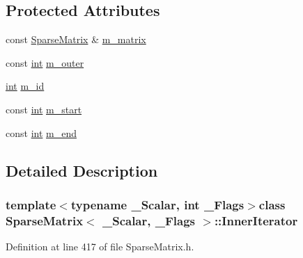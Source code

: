 \subsection*{Protected Attributes}
\begin{DoxyCompactItemize}
\item 
const \hyperlink{class_sparse_matrix}{Sparse\-Matrix} \& \hyperlink{class_sparse_matrix_1_1_inner_iterator_abdfdb78265864b419133fbb24a293c01}{m\-\_\-matrix}
\item 
const \hyperlink{ioapi_8h_a787fa3cf048117ba7123753c1e74fcd6}{int} \hyperlink{class_sparse_matrix_1_1_inner_iterator_aa6bee154b1f23cd7510a459c3bc33c9c}{m\-\_\-outer}
\item 
\hyperlink{ioapi_8h_a787fa3cf048117ba7123753c1e74fcd6}{int} \hyperlink{class_sparse_matrix_1_1_inner_iterator_a715fcceba7bd2cddd4a09572a81f6a3d}{m\-\_\-id}
\item 
const \hyperlink{ioapi_8h_a787fa3cf048117ba7123753c1e74fcd6}{int} \hyperlink{class_sparse_matrix_1_1_inner_iterator_ab921abc4c659845a3e19479047ab56c0}{m\-\_\-start}
\item 
const \hyperlink{ioapi_8h_a787fa3cf048117ba7123753c1e74fcd6}{int} \hyperlink{class_sparse_matrix_1_1_inner_iterator_a5ddf9c88f723aeaa34b3e376e05ff0e7}{m\-\_\-end}
\end{DoxyCompactItemize}


\subsection{Detailed Description}
\subsubsection*{template$<$typename \-\_\-\-Scalar, int \-\_\-\-Flags$>$class Sparse\-Matrix$<$ \-\_\-\-Scalar, \-\_\-\-Flags $>$\-::\-Inner\-Iterator}



Definition at line 417 of file Sparse\-Matrix.\-h.



